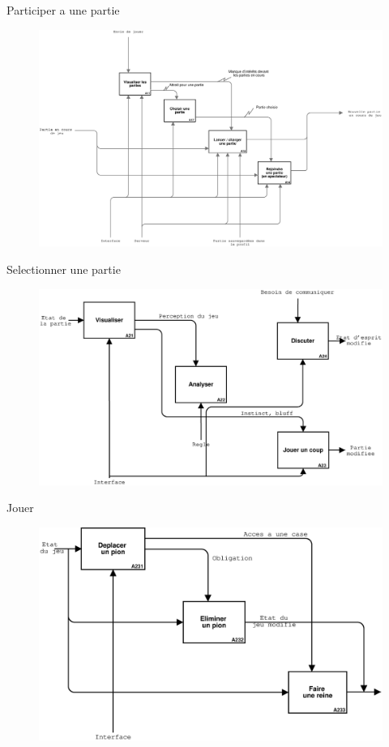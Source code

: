 \documentclass[french,12pt]{report}
\begin{document}
\begin{center}
Participer a une partie

\pagebreak

\begin{figure}[h]
\includegraphics[width=16cm]{A1.eps}
\end{figure}

Selectionner une partie

\pagebreak

\begin{figure}[h]
\includegraphics[width=16cm]{A2.eps}
\end{figure}

Jouer

\pagebreak

\begin{figure}[h]
\includegraphics[width=16cm]{A23.eps}
\end{figure}


\end{center}
\end{document}
